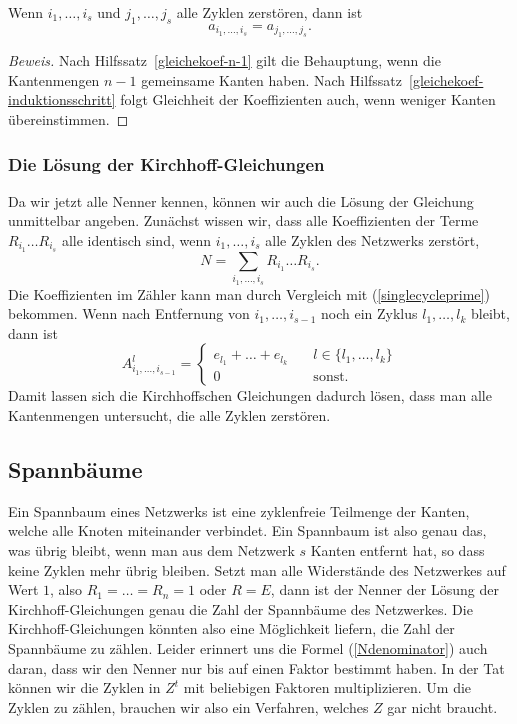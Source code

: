 \begin{satz}
Wenn $i_1,\dots,i_s$ und $j_1,\dots,j_s$ alle Zyklen zerstören,
dann ist 
\[
a_{i_1,\dots,i_s}=a_{j_1,\dots,j_s}.
\]
\end{satz}

\begin{proof}[Beweis]
Nach Hilfssatz~\ref{gleichekoef-n-1} gilt die Behauptung, wenn die Kantenmengen
$n-1$ gemeinsame Kanten haben.
Nach Hilfssatz~\ref{gleichekoef-induktionsschritt} folgt Gleichheit der
Koeffizienten auch, wenn weniger Kanten übereinstimmen.
\end{proof}

\subsubsection{Die Lösung der Kirchhoff-Gleichungen}
Da wir jetzt alle Nenner kennen, können wir auch die Lösung
der Gleichung unmittelbar angeben.
Zunächst wissen wir, dass alle Koeffizienten der Terme
$R_{i_1}\dots R_{i_s}$ alle identisch sind, wenn $i_1,\dots,i_s$
alle Zyklen des Netzwerks zerstört,
\[
N =\sum_{i_1,\dots,i_s}R_{i_1}\dots R_{i_s}.
\]
Die Koeffizienten im Zähler kann man durch Vergleich
mit (\ref{singlecycleprime}) bekommen. Wenn nach Entfernung
von $i_1,\dots,i_{s-1}$ noch ein Zyklus $l_1,\dots,l_k$ bleibt, dann
ist
\[
A_{i_1,\dots,i_{s-1}}^l=\begin{cases}
e_{l_1}+\dots+e_{l_k}&\quad l\in\{l_1,\dots,l_k\}\\
0&\quad \text{sonst.}
\end{cases}
\]
Damit lassen sich die Kirchhoffschen Gleichungen dadurch lösen,
dass man alle Kantenmengen untersucht, die alle Zyklen zerstören.

\subsection{Spannbäume}
Ein Spannbaum eines Netzwerks ist eine zyklenfreie Teilmenge der Kanten,
welche alle Knoten miteinander verbindet.
Ein Spannbaum ist also genau das, was übrig bleibt, wenn man aus dem
Netzwerk $s$ Kanten entfernt hat, so dass keine Zyklen mehr übrig bleiben.
Setzt man alle Widerstände des Netzwerkes auf Wert $1$, also
$R_1=\dots=R_n=1$ oder $R=E$,
dann ist der Nenner der Lösung der Kirchhoff-Gleichungen
genau die Zahl der Spannbäume des Netzwerkes. Die Kirchhoff-Gleichungen
könnten also eine Möglichkeit liefern, die Zahl der Spannbäume
zu zählen. 
Leider erinnert uns die Formel (\ref{Ndenominator}) auch daran, dass  
wir den Nenner nur bis auf einen Faktor bestimmt haben. In der
Tat können wir die Zyklen in $Z^t$ mit beliebigen Faktoren
multiplizieren. Um die Zyklen zu zählen, brauchen wir also
ein Verfahren, welches $Z$ gar nicht braucht.

